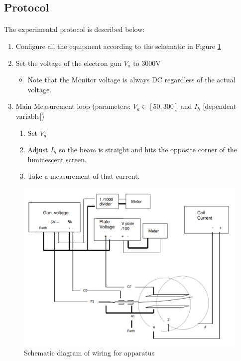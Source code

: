 \documentclass{article}
\begin{document}
\subsection{Protocol}
\paragraph{}
The experimental protocol is described below:

\begin{enumerate}
  \item Configure all the equipment according to the schematic in Figure \ref{fig:schematic}
  \item Set the voltage of the electron gun \(V_a\) to 3000V
  \begin{itemize}
    \item Note that the Monitor voltage is always DC regardless of the actual voltage.
  \end{itemize}
  \item Main Measurement loop (parameters: \(V_a \in [50, 300]\) and \(I_h\) [dependent variable])
  \begin{enumerate}
    \item Set \(V_a\)
    \item Adjust \(I_h\) so the beam is straight and hits the opposite corner of the luminescent screen.
    \item Take a measurement of that current.
  \end{enumerate}
\end{enumerate}

\begin{figure}[h]
  \includegraphics[width=\textwidth]{./img/schematic.pdf}
  \caption{Schematic diagram of wiring for apparatus \autocite{UPCSE2018}}
  \label{fig:schematic}
\end{figure}
\end{document}
